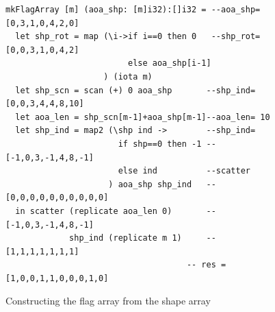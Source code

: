 \documentclass[acmsmall,review]{acmart}\settopmatter{printfolios=true,printccs=false,printacmref=false}
\begin{document}

\begin{figure}
\begin{lstlisting}[mathescape=true]
mkFlagArray [m] (aoa_shp: [m]i32):[]i32 = --aoa_shp=[0,3,1,0,4,2,0]
  let shp_rot = map (\i->if i==0 then 0   --shp_rot=[0,0,3,1,0,4,2]
                         else aoa_shp[i-1]
                    ) (iota m)
  let shp_scn = scan (+) 0 aoa_shp       --shp_ind=[0,0,3,4,4,8,10]
  let aoa_len = shp_scn[m-1]+aoa_shp[m-1]--aoa_len= 10
  let shp_ind = map2 (\shp ind ->        --shp_ind= 
                       if shp==0 then -1 --  [-1,0,3,-1,4,8,-1]
                       else ind          --scatter
                     ) aoa_shp shp_ind   --   [0,0,0,0,0,0,0,0,0,0]
  in scatter (replicate aoa_len 0)       --   [-1,0,3,-1,4,8,-1]
             shp_ind (replicate m 1)     --   [1,1,1,1,1,1,1]
                                     -- res = [1,0,0,1,1,0,0,0,1,0] 
\end{lstlisting}\vspace{-4ex}
\caption{Constructing the flag array from the shape array}
\label{fig:make-flag}
\end{figure}
\end{document}
